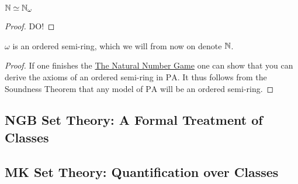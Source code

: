 \begin{theorem}
    $\mathbb{N}\simeq \mathbb{N}_\omega$    
\end{theorem}
\begin{proof}
    {\Large DO!}
\end{proof}
\begin{corollary}
    $\omega$ is an ordered semi-ring, which we will from now on denote $\mathbb{N}$. 
\end{corollary}
\begin{proof}
    If one finishes the \href{https://adam.math.hhu.de/#/g/leanprover-community/nng4}{The Natural Number Game} one can show that you can derive the axioms of an ordered semi-ring in $\mathrm{PA}$. It thus follows from the Soundness Theorem that any model of $\mathrm{PA}$ will be an ordered semi-ring. 
\end{proof}
\subsection{NGB Set Theory: A Formal Treatment of Classes}
\subsection{MK Set Theory: Quantification over Classes}
